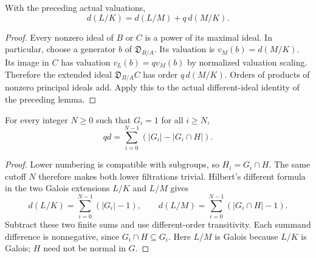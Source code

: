 \begin{lemma}
\label{fw:different-order-transitivity}
\leanok
With the preceding actual valuations,
\[
 d(L/K)=d(L/M)+q\,d(M/K).
\]
\end{lemma}
\begin{proof}
Every nonzero ideal of $B$ or $C$ is a power of its maximal ideal.
In particular, choose a generator $b$ of $\mathfrak D_{B/A}$.
Its valuation is $v_M(b)=d(M/K)$. Its image in $C$ has valuation
$v_L(b)=qv_M(b)$ by normalized valuation scaling. Therefore
the extended ideal $\mathfrak D_{B/A}C$ has order $q\,d(M/K)$.
Orders of products of nonzero principal ideals add. Apply this to the
actual different-ideal identity of the preceding lemma.
\end{proof}

\begin{lemma}
\label{fw:subextension-different-lower-sum}
\leanok
For every integer $N\geq0$ such that $G_i=1$ for all $i\geq N$,
\[
 qd=\sum_{i=0}^{N-1}(|G_i|-|G_i\cap H|).
\]
\end{lemma}
\begin{proof}
Lower numbering is compatible with subgroups, so $H_i=G_i\cap H$.
The same cutoff $N$ therefore makes both lower filtrations trivial.
Hilbert's different formula in the two Galois extensions $L/K$ and
$L/M$ gives
\[
 d(L/K)=\sum_{i=0}^{N-1}(|G_i|-1),\qquad
 d(L/M)=\sum_{i=0}^{N-1}(|G_i\cap H|-1).
\]
Subtract these two finite sums and use different-order transitivity.
Each summand difference is nonnegative, since $G_i\cap H\subseteq G_i$.
Here $L/M$ is Galois because $L/K$ is Galois; $H$ need not be normal
in $G$.
\end{proof}

